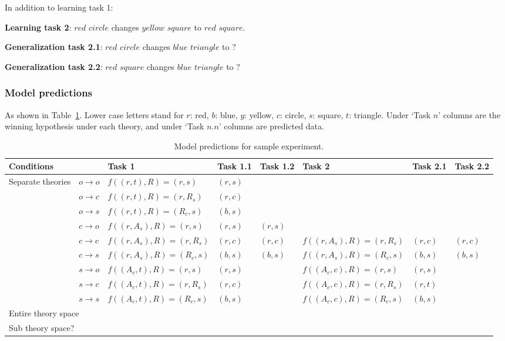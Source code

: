 \documentclass{article}
\begin{document}
\noindent
In addition to learning task 1:

\textbf{Learning task 2}: $red$ $circle$ changes $yellow$ $square$ to $red$ $square$.

\textbf{Generalization task 2.1}: $red$ $circle$ changes $blue$ $triangle$ to $?$

\textbf{Generalization task 2.2}: $red$ $square$ changes $blue$ $triangle$ to $?$

\subsubsection*{Model predictions}

As shown in Table~\ref{pred}. Lower case letters stand for $r$: red, $b$: blue, $y$: yellow, $c$: circle, $s$: square, $t$: triangle. Under `Task $n$' columns are the winning hypothesis under each theory, and under `Task $n.n$' columns are predicted data.

\begin{table}
	\centering
	\begin{tabular}{l|l|l|l|l|l|l|l}
		\multicolumn{2}{l|}{Conditions} & Task 1 & Task 1.1 & Task 1.2 & Task 2 & Task 2.1 & Task 2.2 \\
		\hline \hline
		Separate theories & $o \rightarrow o$ & $f((r, t), R) = (r,s)$ & $(r,s)$ & & & & \\
		& $o \rightarrow c$ & $f((r, t), R) = (r, R_s)$ & $(r,c)$ & & & & \\
		& $o \rightarrow s$ & $f((r, t), R) = (R_c, s)$ & $(b,s)$ & & & & \\
		& $c \rightarrow o$ & $f((r, A_s), R) = (r, s)$ & $(r,s)$ & $(r,s)$ & & & \\
		& $c \rightarrow c$ & $f((r, A_s), R) = (r, R_s)$ & $(r,c)$ & $(r,c)$ & $f((r, A_s), R) = (r, R_s)$ & $(r,c)$ & $(r,c)$ \\
		& $c \rightarrow s$ & $f((r, A_s), R) = (R_c, s)$ & $(b,s)$ & $(b,s)$ & $f((r, A_s), R) = (R_c, s)$ & $(b,s)$ & $(b,s)$ \\
		& $s \rightarrow o$ & $f((A_c, t), R) = (r, s)$ & $(r,s)$ & & $f((A_c, c), R) = (r, s)$ & $(r, s)$ & \\
		& $s \rightarrow c$ & $f((A_c, t), R) = (r, R_s)$ & $(r,c)$ & & $f((A_c, c), R) = (r, R_s)$ & $(r, t)$ & \\
		& $s \rightarrow s$ & $f((A_c, t), R) = (R_c, s)$ & $(b,s)$ & & $f((A_c, c), R) = (R_c, s)$ & $(b, s)$ & \\
		\hline
		\multicolumn{2}{l|}{Entire theory space} & & & & & & \\
		\hline
		\multicolumn{2}{l|}{Sub theory space?} & & & & & & \\
	\end{tabular}
	\caption{Model predictions for sample experiment.}
	\label{pred}
\end{table}
\end{document}
